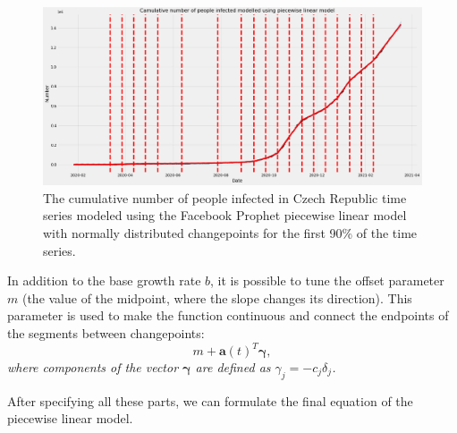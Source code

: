 \begin{figure}[!ht]
\centering
\includegraphics[width=1\textwidth, height=0.5\textwidth]{figures/chapter_03/picewise_model_example.png}
\caption{The cumulative number of people infected in Czech Republic time series modeled using the Facebook Prophet piecewise linear model with normally distributed changepoints for the first 90\% of the time series.}
\label{fig:piecewise_example}
\end{figure}

In addition to the base growth rate $b$, it is possible to tune the offset parameter $m$ (the value of the midpoint, where the slope changes its direction). This parameter is used to make the function continuous and connect the endpoints of the segments between changepoints:
\begin{equation}
    m + \mathbf{a}(t)^{T}\boldsymbol{\gamma},
\end{equation}
\textit{where components of the vector $\boldsymbol{\gamma}$ are defined as $\gamma_j = -c_{j}\delta_{j}$.}

After specifying all these parts, we can formulate the final equation of the piecewise linear model.


